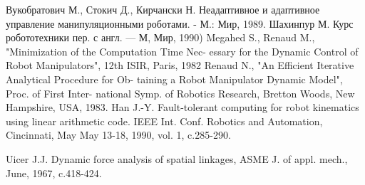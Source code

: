\begin{thebibliography}{99}
Вукобратович М., Стокич Д., Кирчански Н. Неадаптивное и адаптивное управление манипуляционными роботами. - М.: Мир, 1989.
Шахинпур М. Курс робототехники пер. с англ. — М, Мир, 1990)
Megahed S., Renaud M., "Minimization of the Computation Time Nec-
essary for the Dynamic Control of Robot Manipulators", 12th ISIR,
Paris, 1982
Renaud N., "An Efficient Iterative Analytical Procedure for Ob-
taining a Robot Manipulator Dynamic Model", Proc. of First Inter-
national Symp. of Robotics Research, Bretton Woods, New Hampshire,
USA, 1983.
Han J.-Y. Fault-tolerant computing for robot kinematics using linear arithmetic code. IEEE Int. Conf. Robotics and Auto­mation, Cincinnati, May May 13-18, 1990, vol. 1, c.285-290.

Uicer J.J. Dynamic force analysis of spatial linkages, ASME J. of appl. mech., June, 1967, c.418-424.

\end{thebibliography}

